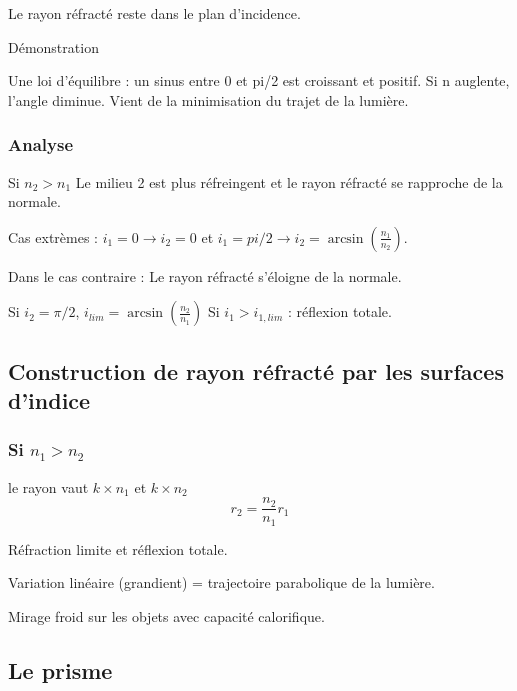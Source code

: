 \documentclass[french]{yLectureNote}
\begin{document}
	Le rayon réfracté reste dans le plan d'incidence.

	Démonstration

	Une loi d'équilibre : un sinus entre 0 et pi/2 est croissant et positif. Si n auglente, l'angle diminue. Vient de la minimisation du trajet de la lumière.

	\subsubsection{Analyse}
	Si $n_2 > n_1$ Le milieu 2 est plus réfreingent et le rayon réfracté se rapproche de la normale.

	Cas extrèmes : $i_1 = 0 \to i_2 = 0$ et $i_1 = pi/2 \to i_2 = \arcsin(\frac{n_1}{n_2})$.

	Dans le cas contraire : Le rayon réfracté s'éloigne de la normale.

	Si $i_2 = \pi/2$, $i_{lim} = \arcsin(\frac{n_2}{n_1})$ Si $i_1 > i_{1,lim}$ : réflexion totale.

	\subsection{Construction de rayon réfracté par les surfaces d'indice}
	\subsubsection{Si $n_1 > n_2$}
	le rayon vaut $k\times n_1$ et $k\times n_2$ \[r_2 = \frac{n_2}{n_1} r_1\]

	Réfraction limite et réflexion totale.

	Variation linéaire (grandient) = trajectoire parabolique de la lumière.

	Mirage froid sur les objets avec capacité calorifique.
	\subsection{Le prisme}
\end{document}
